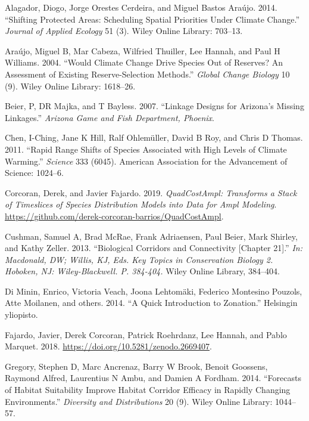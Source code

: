 \documentclass[]{article}
\begin{document}
\leavevmode\hypertarget{ref-alagador2014shifting}{}%
Alagador, Diogo, Jorge Orestes Cerdeira, and Miguel Bastos Araújo. 2014. ``Shifting Protected Areas: Scheduling Spatial Priorities Under Climate Change.'' \emph{Journal of Applied Ecology} 51 (3). Wiley Online Library: 703--13.

\leavevmode\hypertarget{ref-araujo2004would}{}%
Araújo, Miguel B, Mar Cabeza, Wilfried Thuiller, Lee Hannah, and Paul H Williams. 2004. ``Would Climate Change Drive Species Out of Reserves? An Assessment of Existing Reserve-Selection Methods.'' \emph{Global Change Biology} 10 (9). Wiley Online Library: 1618--26.

\leavevmode\hypertarget{ref-beier2007linkage}{}%
Beier, P, DR Majka, and T Bayless. 2007. ``Linkage Designs for Arizona's Missing Linkages.'' \emph{Arizona Game and Fish Department, Phoenix}.

\leavevmode\hypertarget{ref-chen2011rapid}{}%
Chen, I-Ching, Jane K Hill, Ralf Ohlemüller, David B Roy, and Chris D Thomas. 2011. ``Rapid Range Shifts of Species Associated with High Levels of Climate Warming.'' \emph{Science} 333 (6045). American Association for the Advancement of Science: 1024--6.

\leavevmode\hypertarget{ref-Corcoran_Quadcost}{}%
Corcoran, Derek, and Javier Fajardo. 2019. \emph{QuadCostAmpl: Transforms a Stack of Timeslices of Species Distribution Models into Data for Ampl Modeling}. \url{https://github.com/derek-corcoran-barrios/QuadCostAmpl}.

\leavevmode\hypertarget{ref-cushman2013biological}{}%
Cushman, Samuel A, Brad McRae, Frank Adriaensen, Paul Beier, Mark Shirley, and Kathy Zeller. 2013. ``Biological Corridors and Connectivity {[}Chapter 21{]}.'' \emph{In: Macdonald, DW; Willis, KJ, Eds. Key Topics in Conservation Biology 2. Hoboken, NJ: Wiley-Blackwell. P. 384-404.} Wiley Online Library, 384--404.

\leavevmode\hypertarget{ref-di2014quick}{}%
Di Minin, Enrico, Victoria Veach, Joona Lehtomäki, Federico Montesino Pouzols, Atte Moilanen, and others. 2014. ``A Quick Introduction to Zonation.'' Helsingin yliopisto.

\leavevmode\hypertarget{ref-fajardo_javier_2018_2669407}{}%
Fajardo, Javier, Derek Corcoran, Patrick Roehrdanz, Lee Hannah, and Pablo Marquet. 2018. \url{https://doi.org/10.5281/zenodo.2669407}.

\leavevmode\hypertarget{ref-gregory2014forecasts}{}%
Gregory, Stephen D, Marc Ancrenaz, Barry W Brook, Benoit Goossens, Raymond Alfred, Laurentius N Ambu, and Damien A Fordham. 2014. ``Forecasts of Habitat Suitability Improve Habitat Corridor Efficacy in Rapidly Changing Environments.'' \emph{Diversity and Distributions} 20 (9). Wiley Online Library: 1044--57.
\end{document}

